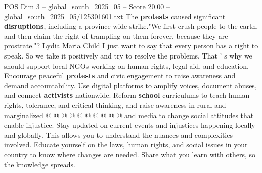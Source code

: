 \begin{textsample}{POS Dim 3 – global\_south\_2025\_05 – Score 20.00 – global\_south\_2025\_05/125301601.txt}
The \textbf{protests} caused significant \textbf{disruptions}, including a province-wide strike."We first crush people to the earth, and then claim the right of trampling on them forever, because they are prostrate."?
Lydia Maria Child I just want to say that every person has a right to speak.
So we take it positively and try to resolve the problems.
That ' s why we should support local NGOs working on human rights, legal aid, and education.
Encourage peaceful \textbf{protests} and civic engagement to raise awareness and demand accountability.
Use digital platforms to amplify voices, document abuses, and connect \textbf{activists} nationwide.
Reform \textbf{school} curriculums to teach human rights, tolerance, and critical thinking, and raise awareness in rural and marginalized @ @ @ @ @ @ @ @ @ @ and media to change social attitudes that enable injustice.
Stay updated on current events and injustices happening locally and globally.
This allows you to understand the nuances and complexities involved.
Educate yourself on the laws, human rights, and social issues in your country to know where changes are needed.
Share what you learn with others, so the knowledge spreads.

\end{textsample}

